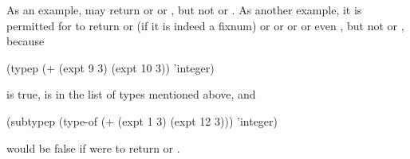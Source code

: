 \begin{defun}[Function]
\begin{new}
As an example, 
may return  or  or ,
but not  or .
As another example, it is permitted for
 to return
 or  (if it is indeed a fixnum) or
 or  or 
or even , but not  or , because
\begin{lisp}
(typep (+ (expt 9 3) (expt 10 3)) 'integer)
\end{lisp}
is true,  is in the list of types mentioned above, and
\begin{lisp}
(subtypep (type-of (+ (expt 1 3) (expt 12 3))) 'integer)
\end{lisp}
would be false if  were to return  or .
\end{new}
\end{defun}




